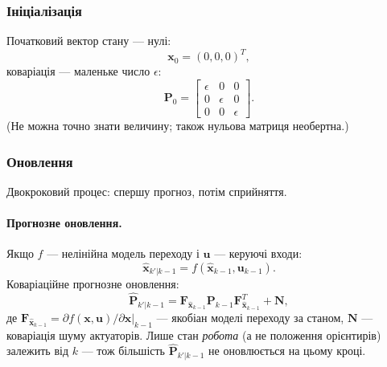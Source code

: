 \subsubsection{Ініціалізація}
Початковий вектор стану — нулі:
\begin{equation}
    \boldsymbol{x}_0 = (0,0,0)^T,
\end{equation}
коваріація — маленьке число $\epsilon$:
\begin{equation}
    \boldsymbol{P}_0 = \begin{bmatrix} \epsilon & 0 & 0 \\ 0 & \epsilon & 0 \\ 0 & 0 & \epsilon \end{bmatrix}.
\end{equation}
(Не можна точно знати величину; також нульова матриця необертна.)

\subsubsection{Оновлення}
Двокроковий процес: спершу прогноз, потім сприйняття.

\paragraph{Прогнозне оновлення.} Якщо $f$ — нелінійна модель переходу і $\boldsymbol{u}$ — керуючі входи:
\begin{equation}
\hat{\boldsymbol{x}}_{k'|k-1}= f(\hat{\boldsymbol{x}}_{k-1},\boldsymbol{u}_{k-1}).
\end{equation}
Коваріаційне прогнозне оновлення:
\begin{equation}
\hat{\boldsymbol{P}}_{k'|k-1} = \boldsymbol{F}_{\hat{\boldsymbol{x}}_{k-1}} \boldsymbol{P}_{k-1} \boldsymbol{F}_{\hat{\boldsymbol{x}}_{k-1}}^T + \boldsymbol{N},
\end{equation}
де $\boldsymbol{F}_{\hat{\boldsymbol{x}}_{k-1}} = \partial f(\boldsymbol{x},\boldsymbol{u})/\partial \boldsymbol{x}|_{k-1}$ — якобіан моделі переходу за станом, $\boldsymbol{N}$ — коваріація шуму актуаторів. Лише стан \emph{робота} (а не положення орієнтирів) залежить від $k$ — тож більшість $\hat{\boldsymbol{P}}_{k'|k-1}$ не оновлюється на цьому кроці.

